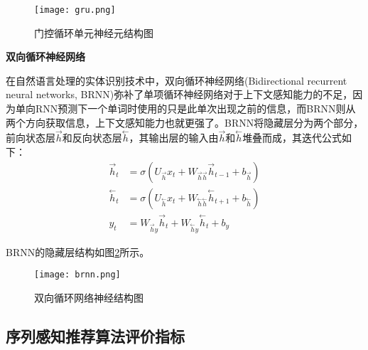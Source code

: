 \begin{figure}[htb]
  \centering
  \texttt{[image: gru.png]}\\
  \caption{门控循环单元神经元结构图}
  \label{fig:gru}
\end{figure}

\textbf{双向循环神经网络}

在自然语言处理的实体识别技术中，双向循环神经网络(Bidirectional recurrent neural networks, BRNN)弥补了单项循环神经网络对于上下文感知能力的不足，因为单向RNN预测下一个单词时使用的只是此单次出现之前的信息，而BRNN则从两个方向获取信息，上下文感知能力也就更强了。BRNN将隐藏层分为两个部分，前向状态层$\stackrel{\rightarrow}{h}$和反向状态层$\stackrel{\leftarrow}{h}$，其输出层的输入由$\stackrel{\rightarrow}{h}$和$\stackrel{\leftarrow}{h}$堆叠而成，其迭代公式如下：
\begin{align} 
  \vec{h}_{t} &= \sigma(U_{\vec{h}} x_{t}+W_{\vec{h} \vec{h}} \vec{h}_{t-1}+b_{\vec{h}}) \label{forword}\\
\stackrel{\leftarrow}{h}_{t} &= \sigma(U_{\stackrel{\leftarrow}{h}} x_{t}+W_{\stackrel{\leftarrow}{h} \stackrel{\leftarrow}{h}} \stackrel{\leftarrow}{h}_{t+1}+b_{\stackrel{\leftarrow}{h}}) \label{backword}\\
y_{t} &= W_{\vec{h} y} \vec{h}_{t}+W_{\stackrel{\leftarrow}{h}y} \stackrel{\leftarrow}{h}_{t}+b_{y} \label{stack}
  \end{align}

BRNN的隐藏层结构如图\ref{fig:brnn}所示。
\begin{figure}[htb]
  \centering
  \texttt{[image: brnn.png]}\\
  \caption{双向循环网络神经结构图}
  \label{fig:brnn}
\end{figure}



\subsection{序列感知推荐算法评价指标}



